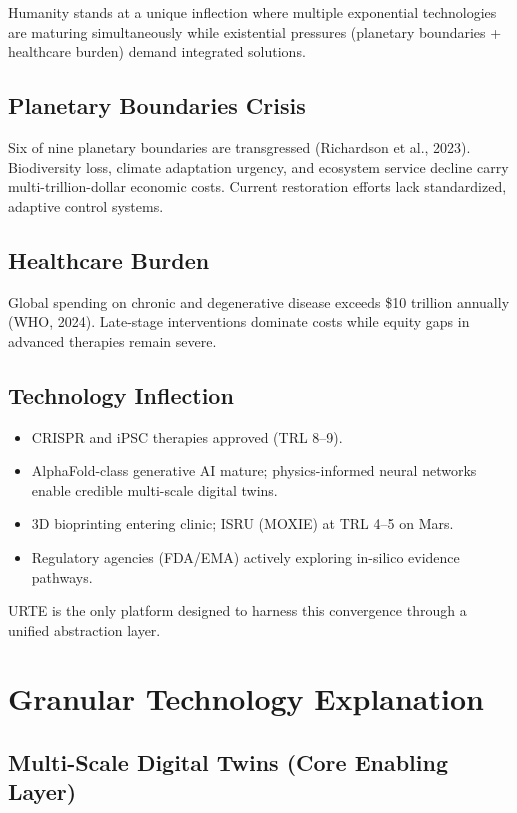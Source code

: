 \documentclass[11pt,a4paper]{article}
\begin{document}
Humanity stands at a unique inflection where multiple exponential technologies are maturing simultaneously while existential pressures (planetary boundaries + healthcare burden) demand integrated solutions.

\subsection{Planetary Boundaries Crisis}
Six of nine planetary boundaries are transgressed (Richardson et al., 2023). Biodiversity loss, climate adaptation urgency, and ecosystem service decline carry multi-trillion-dollar economic costs. Current restoration efforts lack standardized, adaptive control systems.

\subsection{Healthcare Burden}
Global spending on chronic and degenerative disease exceeds \$10 trillion annually (WHO, 2024). Late-stage interventions dominate costs while equity gaps in advanced therapies remain severe.

\subsection{Technology Inflection}
\begin{itemize}
    \item CRISPR and iPSC therapies approved (TRL 8--9).
    \item AlphaFold-class generative AI mature; physics-informed neural networks enable credible multi-scale digital twins.
    \item 3D bioprinting entering clinic; ISRU (MOXIE) at TRL 4--5 on Mars.
    \item Regulatory agencies (FDA/EMA) actively exploring in-silico evidence pathways.
\end{itemize}

URTE is the only platform designed to harness this convergence through a unified abstraction layer.

\section{Granular Technology Explanation}

\subsection{Multi-Scale Digital Twins (Core Enabling Layer)}
\end{document}
